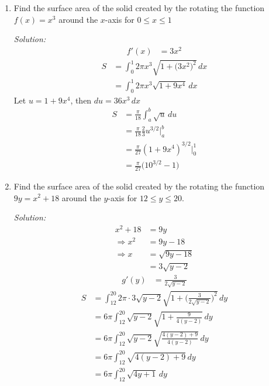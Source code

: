 \documentclass[16pt]{article}
\theoremstyle{remark}
\begin{document}
\begin{enumerate}

\item Find the surface area of the solid created by the rotating the function $f(x) = x^3$ around the $x$-axis for $0 \leq x \leq 1$
\begin{mdframed}[style=TheoremFrame]
\textit{Solution:}
\begin{align*}
f'(x) &= 3x^2
\end{align*}
\begin{align*}
S&= \int_0^1 2\pi x^3 \sqrt{1+\big(3x^2\big)^2} \, dx\\[1.5ex]
&= \int_0^1 2\pi x^3 \sqrt{1+9x^4} \, dx
\end{align*}
Let $u = 1+9x^4$, then $du = 36x^3 \, dx$
\begin{align*}
S&= \frac{\pi}{18} \int_a^b \sqrt{u} \, du\\[1.5ex]
&= \frac{\pi}{18} \frac{2}{3} u^{3/2} \bigg|_a^b\\[1.5ex]
&= \frac{\pi}{27}  (1+9x^4)^{3/2} \bigg|_0^1\\[1.5ex]
&= \frac{\pi}{27} \big( 10^{3/2} - 1 \big)
\end{align*}
\end{mdframed}
\newpage
\item Find the surface area of the solid created by the rotating the function $9y = x^2+18$ around the $y$-axis for $12 \leq y \leq 20$.
\begin{mdframed}[style=TheoremFrame]
\textit{Solution:}
\begin{align*}
x^2+18&=9y\\
\Rightarrow x^2 &= 9y-18\\[1.5ex]
\Rightarrow x &= \sqrt{9y-18}\\[1.5ex]
&= 3 \sqrt{y-2}
\end{align*}
\begin{align*}
g'(y) &= \frac{3}{2\sqrt{y-2}}
\end{align*}
\begin{align*}
S &= \int_{12}^{20} 2 \pi \cdot 3 \sqrt{y-2} \sqrt{1 + \bigg(\frac{3}{2\sqrt{y-2}}\bigg)^2} \, dy\\[1.5ex]
&= 6\pi \int_{12}^{20} \sqrt{y-2}  \sqrt{1 +\frac{9}{4(y-2)}} \, dy\\[1.5ex]
&= 6\pi \int_{12}^{20} \sqrt{y-2}  \sqrt{\frac{4(y-2)+9}{4(y-2)}} \, dy\\[1.5ex]
&= 6\pi \int_{12}^{20} \sqrt{4(y-2)+9} \, dy\\[1.5ex]
&= 6\pi \int_{12}^{20} \sqrt{4y+1} \, dy\\[1.5ex]

\end{align*}
\end{mdframed}
\end{enumerate}
\end{document}
